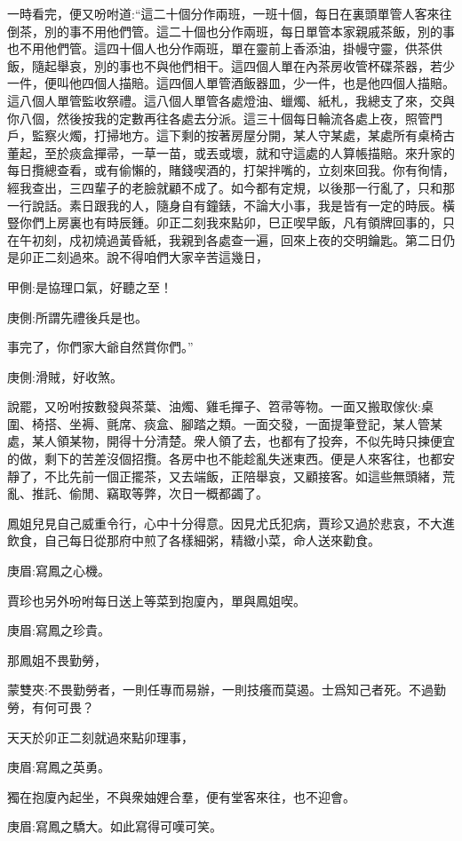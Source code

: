 \begin{parag}
    一時看完，便又吩咐道:“這二十個分作兩班，一班十個，每日在裏頭單管人客來往倒茶，別的事不用他們管。這二十個也分作兩班，每日單管本家親戚茶飯，別的事也不用他們管。這四十個人也分作兩班，單在靈前上香添油，掛幔守靈，供茶供飯，隨起舉哀，別的事也不與他們相干。這四個人單在內茶房收管杯碟茶器，若少一件，便叫他四個人描賠。這四個人單管酒飯器皿，少一件，也是他四個人描賠。這八個人單管監收祭禮。這八個人單管各處燈油、蠟燭、紙札，我總支了來，交與你八個，然後按我的定數再往各處去分派。這三十個每日輪流各處上夜，照管門戶，監察火燭，打掃地方。這下剩的按著房屋分開，某人守某處，某處所有桌椅古董起，至於痰盒撣帚，一草一苗，或丟或壞，就和守這處的人算帳描賠。來升家的每日攬總查看，或有偷懶的，賭錢喫酒的，打架拌嘴的，立刻來回我。你有徇情，經我查出，三四輩子的老臉就顧不成了。如今都有定規，以後那一行亂了，只和那一行說話。素日跟我的人，隨身自有鐘錶，不論大小事，我是皆有一定的時辰。橫豎你們上房裏也有時辰鍾。卯正二刻我來點卯，巳正喫早飯，凡有領牌回事的，只在午初刻，戍初燒過黃昏紙，我親到各處查一遍，回來上夜的交明鑰匙。第二日仍是卯正二刻過來。說不得咱們大家辛苦這幾日，\begin{note}甲側:是協理口氣，好聽之至！\end{note}\begin{note}庚側:所謂先禮後兵是也。\end{note}事完了，你們家大爺自然賞你們。”\begin{note}庚側:滑賊，好收煞。\end{note}
\end{parag}


\begin{parag}
    說罷，又吩咐按數發與茶葉、油燭、雞毛撣子、笤帚等物。一面又搬取傢伙:桌圍、椅搭、坐褥、氈席、痰盒、腳踏之類。一面交發，一面提筆登記，某人管某處，某人領某物，開得十分清楚。衆人領了去，也都有了投奔，不似先時只揀便宜的做，剩下的苦差沒個招攬。各房中也不能趁亂失迷東西。便是人來客往，也都安靜了，不比先前一個正擺茶，又去端飯，正陪舉哀，又顧接客。如這些無頭緒，荒亂、推託、偷閒、竊取等弊，次日一概都蠲了。
\end{parag}


\begin{parag}
    鳳姐兒見自己威重令行，心中十分得意。因見尤氏犯病，賈珍又過於悲哀，不大進飲食，自己每日從那府中煎了各樣細粥，精緻小菜，命人送來勸食。\begin{note}庚眉:寫鳳之心機。\end{note}賈珍也另外吩咐每日送上等菜到抱廈內，單與鳳姐喫。\begin{note}庚眉:寫鳳之珍貴。\end{note}那鳳姐不畏勤勞，\begin{note}蒙雙夾:不畏勤勞者，一則任專而易辦，一則技癢而莫遏。士爲知己者死。不過勤勞，有何可畏？\end{note}天天於卯正二刻就過來點卯理事，\begin{note}庚眉:寫鳳之英勇。\end{note}獨在抱廈內起坐，不與衆妯娌合羣，便有堂客來往，也不迎會。\begin{note}庚眉:寫鳳之驕大。如此寫得可嘆可笑。\end{note}
\end{parag}


